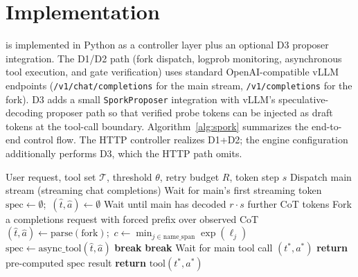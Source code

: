 \section{Implementation}
\label{sec:implementation}

\spork{} is implemented in Python as a controller layer plus an optional D3 proposer
integration.
The D1/D2 path (fork dispatch, logprob monitoring, asynchronous tool execution, and
gate verification) uses standard OpenAI-compatible vLLM endpoints
(\texttt{/v1/chat/completions} for the main stream, \texttt{/v1/completions} for the fork).
D3 adds a small \texttt{SporkProposer} integration with vLLM's speculative-decoding
proposer path so that verified probe tokens can be injected as draft tokens at the
tool-call boundary.
Algorithm~\ref{alg:spork} summarizes the end-to-end control flow.
The HTTP controller realizes D1+D2; the engine configuration additionally performs D3,
which the HTTP path omits.

\begin{algorithm}[t]
\caption{\spork{} Controller with D1+D2+D3}
\label{alg:spork}
\begin{algorithmic}[1]
\REQUIRE User request, tool set $\mathcal{T}$, threshold $\theta$, retry budget $R$, token step $s$
\STATE Dispatch main stream (streaming chat completions)
\STATE Wait for main's first streaming token
\STATE $\mathrm{spec} \gets \emptyset$;\ $(\hat{t},\hat{a}) \gets \emptyset$
\STATE Wait until main has decoded $r\cdot s$ further CoT tokens
\STATE Fork a completions request with forced prefix over observed CoT 
\STATE $(\hat{t},\hat{a}) \gets \mathrm{parse}(\mathrm{fork})$;\ $c \gets \min_{j \in \mathrm{name\_span}} \exp(\ell_j)$ 
\STATE $\mathrm{spec} \gets \mathrm{async\_tool}(\hat{t},\hat{a})$ 
\STATE \textbf{break}
\ENDIF
{}
\STATE \textbf{break}
\ENDIF
\ENDFOR
\STATE Wait for main tool call $(t^*,a^*)$
\STATE \textbf{return} pre-computed $\mathrm{spec}$ result 
\ELSE
\STATE \textbf{return} $\mathrm{tool}(t^*,a^*)$ 
\ENDIF
\end{algorithmic}
\end{algorithm}

